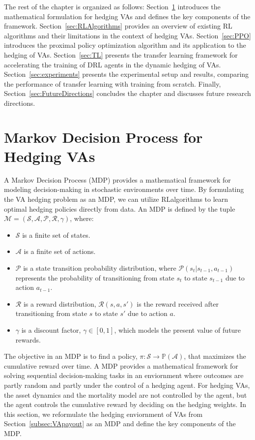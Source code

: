 The rest of the chapter is organized as follows: 
Section~\ref{sec:MDP} introduces the mathematical formulation for hedging VAs and defines the key components of the framework.
Section~\ref{sec:RLAlgorithms} provides an overview of existing RL algorithms and their limitations in the context of hedging VAs.
Section~\ref{sec:PPO} introduces the proximal policy optimization algorithm and its application to the hedging of VAs.
Section~\ref{sec:TL} presents the transfer learning framework for accelerating the training of DRL agents in the dynamic hedging of VAs.
Section~\ref{sec:experiments} presents the experimental setup and results, comparing the performance of transfer learning with training from scratch.
Finally, Section~\ref{sec:FutureDirections} concludes the chapter and discusses future research directions.

\section{Markov Decision Process for Hedging VAs} \label{sec:MDP}

A Markov Decision Process (MDP) provides a mathematical framework for modeling decision-making in stochastic environments over time. 
By formulating the VA hedging problem as an MDP, we can utilize RLalgorithms to learn optimal hedging policies directly from data.
An MDP is defined by the tuple $\mathcal{M} = (\mathcal{S}, \mathcal{A}, \mathcal{P}, \mathcal{R}, \gamma)$, where:

\begin{itemize}
    \item $\mathcal{S}$ is a finite set of states.
    \item $\mathcal{A}$ is a finite set of actions.
    \item $\mathcal{P}$ is a state transition probability distribution, where $\mathcal{P}(s_{t}|s_{t-1}, a_{t-1})$ represents the probability of transitioning from state $s_t$ to state $s_{t-1}$ due to action $a_{t-1}$.
    \item $\mathcal{R}$ is a reward distribution, $\mathcal{R}(s, a, s')$ is the reward received after transitioning from state $s$ to state $s'$ due to action $a$.
    \item $\gamma$ is a discount factor, $\gamma \in [0,1]$,  which models the present value of future rewards.
\end{itemize}

The objective in an MDP is to find a policy, $\pi: \mathcal{S} \rightarrow \mathbb{P}(\mathcal{A})$, that maximizes the cumulative reward over time.
A MDP provides a mathematical framework for solving sequential decision-making tasks in an enviornment where outcomes are partly random and partly under the control of a hedging agent. 
For hedging VAs, the asset dynamics and the mortality model are not controlled by the agent, but the agent controls the cumulative reward by deciding on the hedging weights.
In this section, we reformulate the hedging enviornment of VAs from Section~\ref{subsec:VApayout} as an MDP and define the key components of the MDP.

